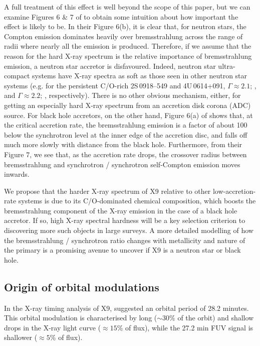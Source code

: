 \documentclass[a4paper,fleqn,usenatbib]{mnras}
\begin{document}
A full treatment of this effect is well beyond the scope of this paper, but we can examine Figures 6 \& 7 of \citet{1995ApJ...452..710N} to obtain some intuition about how important the effect is likely to be. In their Figure 6(b), it is clear that, for neutron stars, the Compton emission dominates heavily over bremsstrahlung across the range of radii where nearly all the emission is produced. Therefore, if we assume that the reason for the hard X-ray spectrum is the relative importance of bremsstrahlung emission, a neutron star accretor is disfavoured. Indeed, neutron star ultra-compact systems have X-ray spectra as soft as those seen in other neutron star systems (e.g. for the persistent C/O-rich 2S\,0918--549 and 4U\,0614+091, $\Gamma \approx 2.1$; \citealp{2005A&A...441..675I}, and $\Gamma \approx 2.2$; \citealp{2010ApJ...710..117M}, respectively). There is no other obvious mechanism, either, for getting an especially hard X-ray spectrum from an accretion disk corona (ADC) source. For black hole accretors, on the other hand, Figure 6(a) of \citet{1995ApJ...452..710N} shows that, at the critical accretion rate, the bremsstrahlung emission is a factor of about 100 below the synchrotron level at the inner edge of the accretion disc, and falls off much more slowly with distance from the black hole. Furthermore, from their Figure 7, we see that, as the accretion rate drops, the crossover radius between bremsstrahlung and synchrotron / synchrotron self-Compton emission moves inwards. 

We propose that the harder X-ray spectrum of X9 relative to other low-accretion-rate systems is due to its C/O-dominated chemical composition, which boosts the bremsstrahlung component of the X-ray emission in the case of a black hole accretor. If so, high X-ray spectral hardness will be a key selection criterion to discovering more such objects in large surveys. A more detailed modelling of how the bremsstrahlung / synchrotron ratio changes with metallicity and nature of the primary is a promising avenue to uncover if X9 is a neutron star or black hole.

\subsection{Origin of orbital modulations}
\label{sec:orb_mod}

In the X-ray timing analysis of X9, \citet{2017MNRAS.467.2199B} suggested an orbital period of 28.2 minutes. This orbital modulation is characterised by long ($\sim30$\% of the orbit) and shallow drops in the X-ray light curve ($\approx 15$\% of flux), while the 27.2 min FUV signal is shallower ($\approx 5$\% of flux). 
\end{document}
